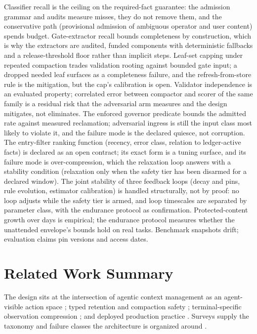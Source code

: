 \documentclass[11pt]{article}
\begin{document}
Classifier recall is the ceiling on the required-fact guarantee: the admission grammar and audits measure misses, they do not remove them, and the conservative path (provisional admission of ambiguous operator and user content) spends budget. Gate-extractor recall bounds completeness by construction, which is why the extractors are audited, funded components with deterministic fallbacks and a release-threshold floor rather than implicit steps. Leaf-set capping under repeated compaction trades validation rooting against bounded gate input; a dropped needed leaf surfaces as a completeness failure, and the refresh-from-store rule is the mitigation, but the cap's calibration is open. Validator independence is an evaluated property; correlated error between compactor and scorer of the same family is a residual risk that the adversarial arm measures and the design mitigates, not eliminates. The enforced governor predicate bounds the admitted rate against measured reclamation; adversarial ingress is still the input class most likely to violate it, and the failure mode is the declared quiesce, not corruption. The entry-filter ranking function (recency, error class, relation to ledger-active facts) is declared as an open contract; its exact form is a tuning surface, and its failure mode is over-compression, which the relaxation loop answers with a stability condition (relaxation only when the safety tier has been disarmed for a declared window). The joint stability of three feedback loops (decay and pins, rule evolution, estimator calibration) is handled structurally, not by proof: no loop adjusts while the safety tier is armed, and loop timescales are separated by parameter class, with the endurance protocol as confirmation. Protected-content growth over days is empirical; the endurance protocol measures whether the unattended envelope's bounds hold on real tasks. Benchmark snapshots drift; evaluation claims pin versions and access dates.

\section{Related Work Summary}

The design sits at the intersection of agentic context management as an agent-visible action space \cite{acm2026,cat2026,folding2026,agentfold2026}; typed retention and compaction safety \cite{cliff2026,theory2026,lifecycle2026}; terminal-specific observation compression \cite{taco2026,hymem2026}; and deployed production practice \cite{anthropic2026docs,anthropic2026cookbook,dream2026}. Surveys supply the taxonomy and failure classes the architecture is organized around \cite{survey2026compress,mei2025survey,naacl2025survey}.
\end{document}
